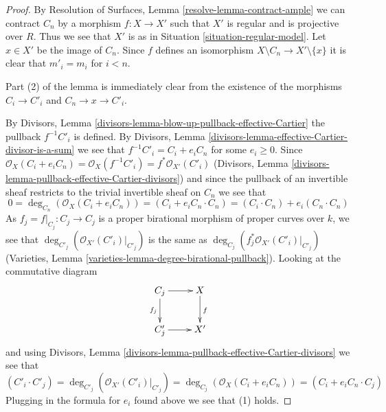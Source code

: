 \documentclass{stacks-project}
\theoremstyle{plain}
\theoremstyle{definition}
\theoremstyle{remark}
\numberwithin{equation}{subsection}
\begin{document}
\begin{proof}
By Resolution of Surfaces, Lemma \ref{resolve-lemma-contract-ample}
we can contract $C_n$ by a morphism $f : X \to X'$ such that $X'$ is
regular and is projective over $R$. Thus we see that $X'$ is as in
Situation \ref{situation-regular-model}.
Let $x \in X'$ be the image of $C_n$.
Since $f$ defines an isomorphism $X \setminus C_n \to X' \setminus \{x\}$
it is clear that $m'_i = m_i$ for $i < n$.

\medskip\noindent
Part (2) of the lemma is immediately clear from
the existence of the morphisms $C_i \to C'_i$ and $C_n \to x \to C'_i$.

\medskip\noindent
By Divisors, Lemma \ref{divisors-lemma-blow-up-pullback-effective-Cartier}
the pullback $f^{-1}C'_i$ is defined. By
Divisors, Lemma \ref{divisors-lemma-effective-Cartier-divisor-is-a-sum}
we see that $f^{-1}C'_i = C_i + e_i C_n$ for some $e_i \geq 0$. Since
$\mathcal{O}_X(C_i + e_i C_n) = \mathcal{O}_X(f^{-1}C'_i) =
f^*\mathcal{O}_{X'}(C'_i)$
(Divisors, Lemma \ref{divisors-lemma-pullback-effective-Cartier-divisors})
and since the pullback of an invertible sheaf restricts to the
trivial invertible sheaf on $C_n$ we see that
$$
0 = \deg_{C_n}(\mathcal{O}_X(C_i + e_i C_n)) =
(C_i + e_i C_n \cdot C_n) = (C_i \cdot C_n) + e_i(C_n \cdot C_n)
$$
As $f_j = f|_{C_j} : C_j \to C_j$ is a
proper birational morphism of proper curves
over $k$, we see that $\deg_{C'_j}(\mathcal{O}_{X'}(C'_i)|_{C'_j})$ is the
same as $\deg_{C_j}(f_j^*\mathcal{O}_{X'}(C'_i)|_{C'_j})$
(Varieties, Lemma \ref{varieties-lemma-degree-birational-pullback}).
Looking at the commutative diagram
$$
\xymatrix{
C_j \ar[r] \ar[d]_{f_j} & X \ar[d]^f \\
C'_j \ar[r] & X'
}
$$
and using Divisors, Lemma
\ref{divisors-lemma-pullback-effective-Cartier-divisors}
we see that
$$
(C'_i \cdot C'_j) = \deg_{C'_j}(\mathcal{O}_{X'}(C'_i)|_{C'_j}) =
\deg_{C_j}(\mathcal{O}_X(C_i + e_i C_n)) = (C_i + e_i C_n \cdot C_j)
$$
Plugging in the formula for $e_i$ found above we see that (1) holds.
\end{proof}
\end{document}
